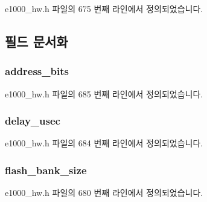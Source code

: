 e1000\+\_\+hw.\+h 파일의 675 번째 라인에서 정의되었습니다.



\subsection{필드 문서화}
\subsubsection[{\texorpdfstring{address\+\_\+bits}{address_bits}}]{ address\+\_\+bits}\hypertarget{structe1000__nvm__info_abb01723804d22f0c3c8a4fd503f26bf8}{}\label{structe1000__nvm__info_abb01723804d22f0c3c8a4fd503f26bf8}


e1000\+\_\+hw.\+h 파일의 685 번째 라인에서 정의되었습니다.

\subsubsection[{\texorpdfstring{delay\+\_\+usec}{delay_usec}}]{ delay\+\_\+usec}\hypertarget{structe1000__nvm__info_a3d6025c25095a2fa2809b29fd4fc5f8d}{}\label{structe1000__nvm__info_a3d6025c25095a2fa2809b29fd4fc5f8d}


e1000\+\_\+hw.\+h 파일의 684 번째 라인에서 정의되었습니다.

\subsubsection[{\texorpdfstring{flash\+\_\+bank\+\_\+size}{flash_bank_size}}]{ flash\+\_\+bank\+\_\+size}\hypertarget{structe1000__nvm__info_a50aa1e3c49675045e1992c3435927b7b}{}\label{structe1000__nvm__info_a50aa1e3c49675045e1992c3435927b7b}


e1000\+\_\+hw.\+h 파일의 680 번째 라인에서 정의되었습니다.

